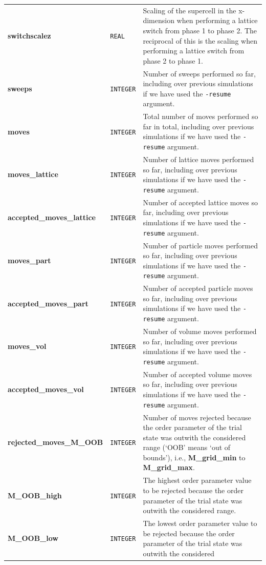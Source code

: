 \documentclass{report}
\begin{document}
\begin{landscape}
\begin{center}
\begin{longtable}{ l l p{8cm}}
\textbf{switchscalez} & \texttt{REAL} & Scaling of the supercell in the x-dimension when performing a lattice switch from phase 1 to phase 2. The 
reciprocal of this is the scaling when performing a lattice switch from phase 2 to phase 1. \\
\textbf{sweeps} & \texttt{INTEGER} & Number of sweeps performed so far, including over previous simulations if we have used the \texttt{-resume} argument.\\
\textbf{moves} & \texttt{INTEGER} & Total number of moves performed so far in total, including over previous simulations if we have used the \texttt{-resume} 
argument.\\
\textbf{moves\_lattice} & \texttt{INTEGER} & Number of lattice moves performed so far, including over previous simulations if we have used the 
 \texttt{-resume} argument.\\
\textbf{accepted\_moves\_lattice} & \texttt{INTEGER} & Number of accepted lattice moves so far, including over previous simulations if we have used the 
 \texttt{-resume} argument.\\
\textbf{moves\_part} & \texttt{INTEGER} & Number of particle moves performed so far, including over previous simulations if we have used the 
 \texttt{-resume} argument.\\
\textbf{accepted\_moves\_part} & \texttt{INTEGER} & Number of accepted particle moves so far, including over previous simulations if we have used the 
 \texttt{-resume} argument.\\
\textbf{moves\_vol} &\texttt{INTEGER} & Number of volume moves performed so far, including over previous simulations if we have used the 
 \texttt{-resume} argument.\\
\textbf{accepted\_moves\_vol} & \texttt{INTEGER} & Number of accepted volume moves so far, including over previous simulations if we have used the 
 \texttt{-resume} argument.\\
\textbf{rejected\_moves\_M\_OOB} & \texttt{INTEGER} & Number of moves rejected because the order parameter of the trial state was outwith the considered range 
(`OOB' means `out of bounds'), i.e., \textbf{M\_grid\_min} to \textbf{M\_grid\_max}.\\
\textbf{M\_OOB\_high} & \texttt{INTEGER} & The highest order parameter value to be rejected because the order parameter of the trial state was outwith the 
considered range.\\
\textbf{M\_OOB\_low} & \texttt{INTEGER} & The lowest order parameter value to be rejected because the order parameter of the trial state was outwith the considered 

\end{longtable}
\end{center}
\end{landscape}
\end{document}
